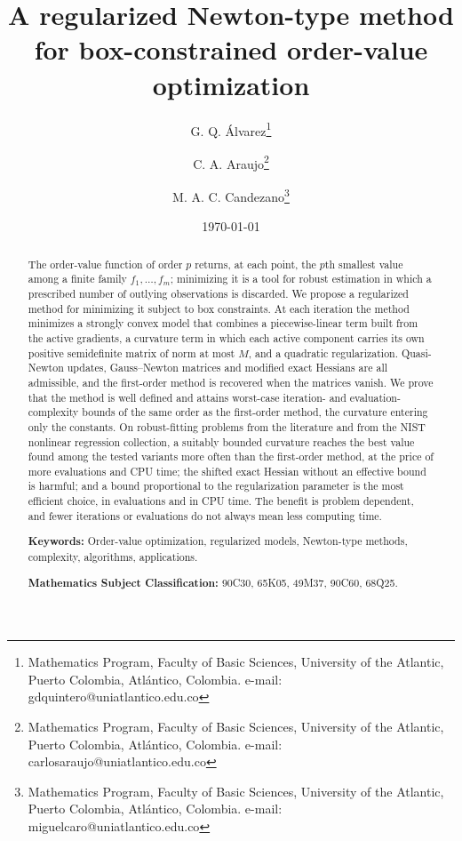 \documentclass[11pt]{article}
\newcounter{alg}[section]
\begin{document}
\title{A regularized Newton-type method for box-constrained order-value optimization}

\author{
    G. Q. Álvarez\thanks{Mathematics Program, Faculty of Basic Sciences, University of the Atlantic, Puerto Colombia, Atlántico, Colombia. e-mail: gdquintero@uniatlantico.edu.co}
    \and 
    C. A. Araujo\thanks{Mathematics Program, Faculty of Basic Sciences, University of the Atlantic, Puerto Colombia, Atlántico, Colombia. e-mail: carlosaraujo@uniatlantico.edu.co}
    \and
    M. A. C. Candezano\thanks{Mathematics Program, Faculty of Basic Sciences, University of the Atlantic, Puerto Colombia, Atlántico, Colombia. e-mail: miguelcaro@uniatlantico.edu.co}
}

\date{\today}
\maketitle

\begin{abstract}
The order-value function of order $p$ returns, at each point, the $p$th
smallest value among a finite family $f_1,\dots,f_m$; minimizing it is a tool
for robust estimation in which a prescribed number of outlying observations is
discarded. We propose a regularized method for minimizing it subject to box
constraints. At each iteration the method minimizes a strongly convex model
that combines a piecewise-linear term built from the active gradients, a
curvature term in which each active component carries its own positive
semidefinite matrix of norm at most $M$, and a quadratic regularization.
Quasi-Newton updates, Gauss--Newton matrices and modified exact Hessians are
all admissible, and the first-order method is recovered when the matrices
vanish. We prove that the method is well defined and attains worst-case
iteration- and evaluation-complexity bounds of the same order as the
first-order method, the curvature entering only the constants. On
robust-fitting problems from the literature and from the NIST nonlinear
regression collection, a suitably bounded curvature reaches the best value
found among the tested variants more often than the first-order method, at
the price of more evaluations and CPU time; the shifted exact Hessian without
an effective bound is harmful; and a bound proportional to the regularization
parameter is the most efficient choice, in evaluations and in CPU time. The
benefit is problem dependent, and fewer iterations or evaluations do not
always mean less computing time.

\medskip
\noindent
\textbf{Keywords:} Order-value optimization, regularized models,
Newton-type methods, complexity, algorithms, applications.

\medskip
\noindent
\textbf{Mathematics Subject Classification:} 90C30, 65K05, 49M37, 90C60, 68Q25.
\end{abstract}
\end{document}
